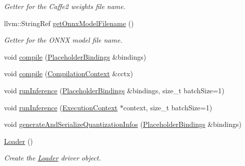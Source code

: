 \begin{DoxyCompactItemize}
\begin{DoxyCompactList}\small\item\em Getter for the Caffe2 weights file name. \end{DoxyCompactList}\item 
\mbox{\label{classglow_1_1_loader_a191c0e3b65fa20ce9fc9fd09864ba905}} 
llvm\+::\+String\+Ref \hyperlink{classglow_1_1_loader_a191c0e3b65fa20ce9fc9fd09864ba905}{get\+Onnx\+Model\+Filename} ()
\begin{DoxyCompactList}\small\item\em Getter for the O\+N\+NX model file name. \end{DoxyCompactList}\item 
void \hyperlink{classglow_1_1_loader_ae4de9bae2b55c206b465ca7bef1c84fc}{compile} (\hyperlink{classglow_1_1_placeholder_bindings}{Placeholder\+Bindings} \&bindings)
\item 
void \hyperlink{classglow_1_1_loader_a7e9422518c187cb81a554c4cc1b87769}{compile} (\hyperlink{structglow_1_1_compilation_context}{Compilation\+Context} \&cctx)
\item 
void \hyperlink{classglow_1_1_loader_aa0768ad9d8b71e237706a674b25d4376}{run\+Inference} (\hyperlink{classglow_1_1_placeholder_bindings}{Placeholder\+Bindings} \&bindings, size\+\_\+t batch\+Size=1)
\item 
void \hyperlink{classglow_1_1_loader_a0ccdbb5f29cb349efe8f3e34ff6a0fcd}{run\+Inference} (\hyperlink{classglow_1_1_execution_context}{Execution\+Context} $\ast$context, size\+\_\+t batch\+Size=1)
\item 
void \hyperlink{classglow_1_1_loader_a4f1ea05794900ee3b6228f4d32229cfb}{generate\+And\+Serialize\+Quantization\+Infos} (\hyperlink{classglow_1_1_placeholder_bindings}{Placeholder\+Bindings} \&bindings)
\item 
\mbox{\label{classglow_1_1_loader_a7bc9da9be2c78f9207d47fd43bb9a8c7}} 
\hyperlink{classglow_1_1_loader_a7bc9da9be2c78f9207d47fd43bb9a8c7}{Loader} ()
\begin{DoxyCompactList}\small\item\em Create the \hyperlink{classglow_1_1_loader}{Loader} driver object. \end{DoxyCompactList}\end{DoxyCompactItemize}
